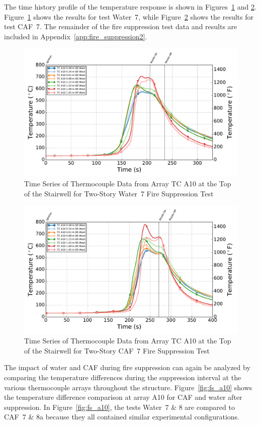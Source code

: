 \documentclass[12pt,oneside]{book}
\begin{document}
The time history profile of the temperature response is shown in Figures~\ref{fig:water7_tca10} and \ref{fig:caf7_tca10}. Figure~\ref{fig:water7_tca10} shows the results for test Water~7, while Figure~\ref{fig:caf7_tca10} shows the results for test CAF~7. The remainder of the fire suppression test data and results are included in Appendix~\ref{app:fire_suppression2}.

\begin{figure}[!ht]
	\includegraphics[width=.85\columnwidth]{../Figures/Script_Figures/Test_39_West_061315_TC_A10}
	\caption{Time Series of Thermocouple Data from Array TC A10 at the Top of the Stairwell for Two-Story Water~7 Fire Suppression Test}
	\label{fig:water7_tca10}
\end{figure}

\begin{figure}[!ht]
	\includegraphics[width=.85\columnwidth]{../Figures/Script_Figures/Test_38_West_061315_TC_A10}
	\caption{Time Series of Thermocouple Data from Array TC A10 at the Top of the Stairwell for Two-Story CAF~7 Fire Suppression Test}
	\label{fig:caf7_tca10}
\end{figure}

The impact of water and CAF during fire suppression can again be analyzed by comparing the temperature differences during the suppression interval at the various thermocouple arrays throughout the structure. Figure~\ref{fig:fs_a10} shows the temperature difference comparison at array A10 for CAF and water after suppression. In Figure~\ref{fig:fs_a10}, the tests Water~7 \& 8 are compared to CAF~7 \& 8a because they all contained similar experimental configurations.
\end{document}
